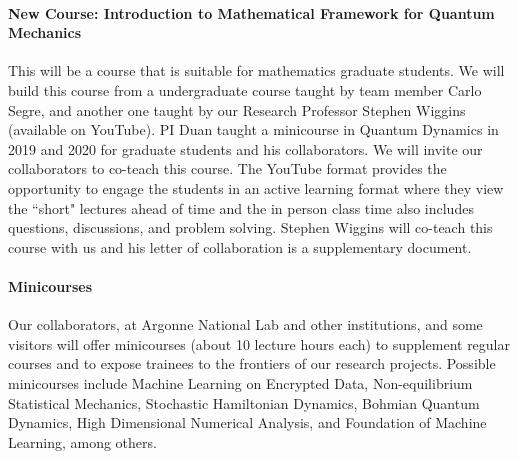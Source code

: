 \documentclass[11pt]{NSFamsart}
\newcommand{\bfparagraph}[1]{\paragraph{\textbf{\textup{#1}}}}
\begin{document}
\bfparagraph{New Course: Introduction to Mathematical Framework for Quantum Mechanics} This will be a course that is suitable for mathematics graduate students. We will build this course from  a   undergraduate course   taught by team member Carlo Segre, and another one taught by our Research Professor Stephen Wiggins (available on YouTube). PI Duan   taught a minicourse in Quantum Dynamics \cite{Gutzwiller1990ChaosIC, Holland1993TheQT,Lindgren2019QuantumMC,Micha2006QuantumDW} in 2019 and 2020 for graduate students and his collaborators.  We will invite our collaborators to co-teach this course. 
The YouTube format provides the opportunity to engage the students in an active learning format where they view the “short" lectures ahead of time and the in person class time  also includes  questions, discussions, and problem solving. Stephen Wiggins will co-teach this course with us and his letter of collaboration is a supplementary document.





\bfparagraph{Minicourses} 
Our collaborators, at Argonne National Lab and other institutions, and some visitors will offer minicourses (about 10 lecture hours each) to supplement regular courses and to expose trainees to the frontiers of our research projects. Possible minicourses include  Machine Learning on Encrypted Data,  Non-equilibrium Statistical Mechanics,  Stochastic Hamiltonian Dynamics, Bohmian Quantum Dynamics, High Dimensional Numerical Analysis, and Foundation of Machine Learning, among others.
\end{document}
